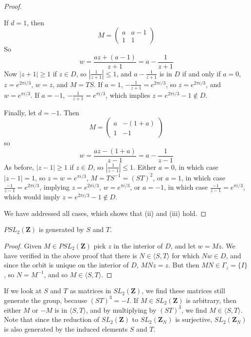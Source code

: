 \begin{proof}
\begin{itemize}
        If $d = 1$, then
        \[ M = \begin{pmatrix} a & a-1 \\ 1 & 1 \end{pmatrix} \]
        So
        \[ w = \frac{az + (a-1)}{z + 1} = a - \frac{1}{z+1} \]
        Now $|z+1| \geq 1$ if $z \in D$, so $|\frac{1}{z+1}| \leq 1$, and $a - \frac{1}{z+1}$ is in $D$ if and only if $a = 0$, $z = e^{2\pi i/3}$, $w = z$, and $M = TS$. If $a = 1$, $- \frac{1}{z+1} = e^{2\pi i/3}$, so $z = e^{2 \pi i/3}$, and $w = e^{\pi i/3}$. If $a = -1$, $- \frac{1}{z+1} = e^{\pi i/3}$, which implies $z = e^{2 \pi i/3} - 1 \not \in D$.

        Finally, let $d = -1$. Then
        \[ M = \begin{pmatrix} a & -(1 + a) \\ 1 & -1 \end{pmatrix} \]
        so
        \[ w = \frac{az - (1+a)}{z-1} = a - \frac{1}{z-1} \]
        As before, $|z-1| \geq 1$ if $z \in D$, so $|\frac{1}{z-1}| \leq 1$. Either $a = 0$, in which case $|z-1| = 1$, so $z = w = e^{\pi i/3}$, $M = TS^{-1} = (ST)^2$, or $a = 1$, in which case $\frac{-1}{z-1} = e^{2\pi i/3}$, implying $z = e^{2\pi i/3}$, $w = e^{\pi i/3}$, or $a = -1$, in which case $\frac{-1}{z-1} = e^{\pi i/3}$, which would imply $z = e^{2\pi i/3} - 1 \not \in D$.
    \end{itemize}
    We have addressed all cases, which shows that (ii) and (iii) hold.
\end{proof}

\begin{corollary}
    $PSL_2(\mathbf{Z})$ is generated by $S$ and $T$.
\end{corollary}
\begin{proof}
    Given $M \in PSL_2(\mathbf{Z})$ pick $z$ in the interior of $D$, and let $w = M z$. We have verified in the above proof that there is $N \in \langle S, T \rangle$ for which $Nw \in D$, and since the orbit is unique on the interior of $D$, $MNz = z$. But then $MN \in \Gamma_z = \{ I \}$, so $N = M^{-1}$, and so $M \in \langle S, T \rangle$.
\end{proof}

\begin{remark}
    If we look at $S$ and $T$ as matrices in $SL_2(\mathbf{Z})$, we find these matrices still generate the group, because $(ST)^3 = -I$. If $M \in SL_2(\mathbf{Z})$ is arbitrary, then either $M$ or $-M$ is in $\langle S ,T \rangle$, and by multiplying by $(ST)^3$, we find $M \in \langle S, T \rangle$. Note that since the reduction of $SL_2(\mathbf{Z})$ to $SL_2(\mathbf{Z}_N)$ is surjective, $SL_2(\mathbf{Z}_N)$ is also generated by the induced elements $S$ and $T$.
\end{remark}

